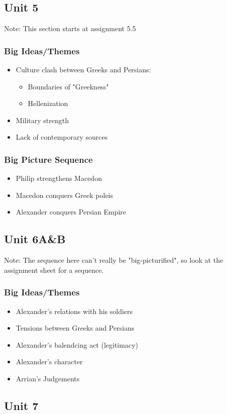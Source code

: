 \documentclass{article}
\begin{document}
\subsection*{Unit 5}
Note: This section starts at assignment 5.5
\subsubsection*{Big Ideas/Themes}
\begin{itemize}
  \item Culture clash between Greeks and Persians:
  \begin{itemize}
    \item Boundaries of "Greekness"
    \item Hellenization
  \end{itemize}
  \item Military strength
  \item Lack of contemporary sources
\end{itemize}
\subsubsection*{Big Picture Sequence}
\begin{itemize}
  \item Philip strengthens Macedon
  \item Macedon conquers Greek poleis
  \item Alexander conquers Persian Empire
\end{itemize}
\subsection*{Unit 6A&B}
Note: The sequence here can't really be "big-picturified", so look at the assignment sheet
for a sequence.
\subsubsection*{Big Ideas/Themes}
\begin{itemize}
  \item Alexander's relations with his soldiers
  \item Tensions between Greeks and Persians
  \item Alexander's balendcing act (legitimacy)
  \item Alexander's character
  \item Arrian's Judgements
\end{itemize}
\subsection*{Unit 7}
\end{document}
